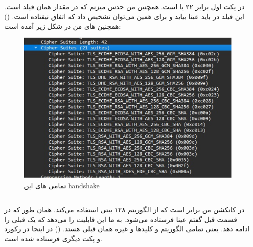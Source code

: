 \documentclass[]{article}
\begin{document}
\subsection{}
در پکت اول
 برابر ۲۲ یا  است.
همچنین من حدس میزنم که در
مقدار
همان فیلد
است. این فیلد در
باید عینا بیاید و برای همین می‌توان تشخیص داد که
اتفاق نیفتاده است.
()
همچنین
های
من در شکل زیر آمده است:
\begin{figure}[h]
    \centering
    \includegraphics[scale=0.5]{pics/tls-ciphers.jpg}
    \caption{تمامی های این handshake}
\end{figure}
\subsection{}
در کانکشن من  برابر
است که از الگوریتم
 ۱۲۸ بیتی استفاده می‌کند.
همان طور که در قسمت قبل گفتم
عینا فرستاده می‌شود.
به ما این قابلیت را می‌دهد که یک
قبلی را ادامه دهد. یعنی تمامی الگوریتم و کلید‌ها و غیره همان قبلی هستد.
()
در اینجا
در رکورد و پکت دیگری فرستاده شده است.
\end{document}
